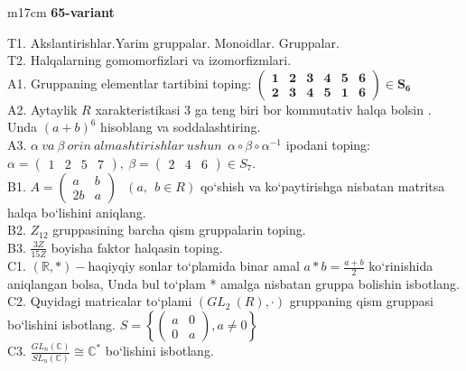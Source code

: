 \documentclass{article}
\begin{document}
\begin{tabular}{m{17cm}}
\textbf{65-variant}
\newline

T1. Akslantirishlar.Yarim gruppalar. Monoidlar. Gruppalar. \\
T2. Halqalarning gomomorfizlari va izomorfizmlari. \\
A1. Gruppaning elementlar tartibini toping: \(\begin{pmatrix}
\mathbf{1} & \mathbf{2} & \mathbf{3} & \mathbf{4} & \mathbf{5} & \mathbf{6} \\
\mathbf{2} & \mathbf{3} & \mathbf{4} & \mathbf{5} & \mathbf{1} & \mathbf{6}
\end{pmatrix}\mathbf{\in}\mathbf{S}_{\mathbf{6}}\) \\
A2. Aytaylik \(R\) xarakteristikasi 3 ga teng biri bor kommutativ halqa bo\textquotesingle lsin . Unda \((a + b)^{6}\) hisoblang va soddalashtiring. \\
A3. \(\alpha\ va\ \beta\ orin\ almashtirishlar\ ushun\ \ \alpha \circ \beta \circ \alpha^{- 1}\) ipodani toping:\(\alpha = \begin{pmatrix}
1 & 2 & 5 & 7
\end{pmatrix},\ \beta = \begin{pmatrix}
2 & 4 & 6
\end{pmatrix} \in S_{7}\). \\
B1. \(A = \begin{pmatrix}
a & b \\
2b & a
\end{pmatrix}\ \ \ (a,\ \ b \in R)\) qo`shish va ko`paytirishga nisbatan matritsa halqa bo`lishini aniqlang. \\
B2. \(Z_{12}\) gruppasining barcha qism gruppalarin toping. \\
B3. \(\frac{3Z}{15Z}\) boyisha faktor halqasin toping. \\
C1. \((\mathbb{R},*) -\)haqiyqiy sonlar to`plamida binar amal \(a*b = \frac{a + b}{2}\) ko`rinishida aniqlangan bolsa, Unda bul to`plam * amalga nisbatan gruppa bolishin isbotlang. \\
C2. Quyidagi matricalar to`plami \((GL_{2}^{\ }\ (R), \cdot )\) gruppaning qism gruppasi bo`lishini isbotlang. \(S = \left\{ \begin{pmatrix}
a & 0 \\
0 & a
\end{pmatrix},a \neq 0 \right\}\) \\
C3. \(\frac{GL_{n}(\mathbb{C})}{SL_{n}(\mathbb{C})} \cong \mathbb{C}^{*}\) bo`lishini isbotlang. \\

\end{tabular}
\vspace{1cm}
\end{document}
